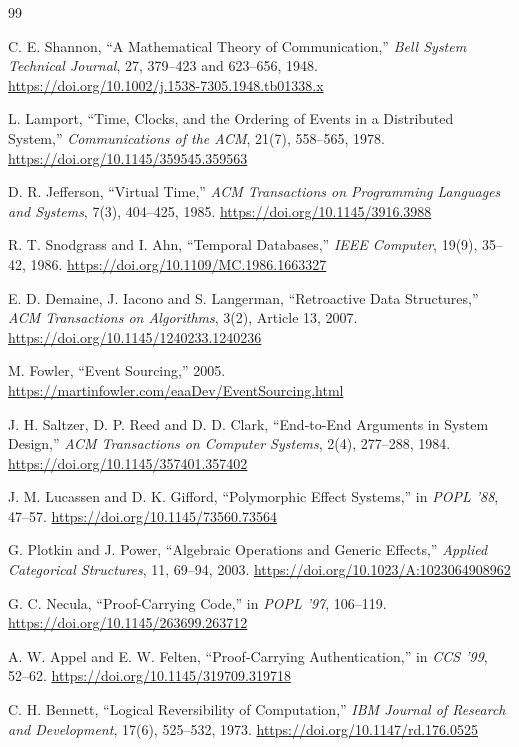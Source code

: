 \documentclass[11pt,a4paper]{article}
\theoremstyle{remark}
\begin{document}
\begin{thebibliography}{99}

C. E. Shannon,
``A Mathematical Theory of Communication,''
\emph{Bell System Technical Journal}, 27, 379--423 and 623--656, 1948.
\url{https://doi.org/10.1002/j.1538-7305.1948.tb01338.x}

L. Lamport,
``Time, Clocks, and the Ordering of Events in a Distributed System,''
\emph{Communications of the ACM}, 21(7), 558--565, 1978.
\url{https://doi.org/10.1145/359545.359563}

D. R. Jefferson,
``Virtual Time,''
\emph{ACM Transactions on Programming Languages and Systems}, 7(3),
404--425, 1985.
\url{https://doi.org/10.1145/3916.3988}

R. T. Snodgrass and I. Ahn,
``Temporal Databases,''
\emph{IEEE Computer}, 19(9), 35--42, 1986.
\url{https://doi.org/10.1109/MC.1986.1663327}

E. D. Demaine, J. Iacono and S. Langerman,
``Retroactive Data Structures,''
\emph{ACM Transactions on Algorithms}, 3(2), Article 13, 2007.
\url{https://doi.org/10.1145/1240233.1240236}

M. Fowler,
``Event Sourcing,'' 2005.
\url{https://martinfowler.com/eaaDev/EventSourcing.html}

J. H. Saltzer, D. P. Reed and D. D. Clark,
``End-to-End Arguments in System Design,''
\emph{ACM Transactions on Computer Systems}, 2(4), 277--288, 1984.
\url{https://doi.org/10.1145/357401.357402}

J. M. Lucassen and D. K. Gifford,
``Polymorphic Effect Systems,'' in \emph{POPL '88}, 47--57.
\url{https://doi.org/10.1145/73560.73564}

G. Plotkin and J. Power,
``Algebraic Operations and Generic Effects,''
\emph{Applied Categorical Structures}, 11, 69--94, 2003.
\url{https://doi.org/10.1023/A:1023064908962}

G. C. Necula,
``Proof-Carrying Code,'' in \emph{POPL '97}, 106--119.
\url{https://doi.org/10.1145/263699.263712}

A. W. Appel and E. W. Felten,
``Proof-Carrying Authentication,'' in \emph{CCS '99}, 52--62.
\url{https://doi.org/10.1145/319709.319718}

C. H. Bennett,
``Logical Reversibility of Computation,''
\emph{IBM Journal of Research and Development}, 17(6), 525--532, 1973.
\url{https://doi.org/10.1147/rd.176.0525}


\end{thebibliography}
\end{document}
